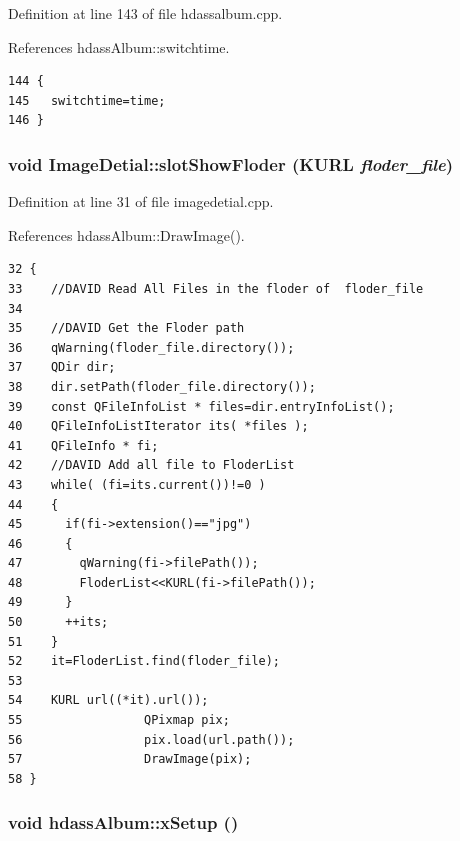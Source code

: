 Definition at line 143 of file hdassalbum.cpp.

References hdass\-Album::switchtime.



\footnotesize\begin{verbatim}144 {
145   switchtime=time;
146 }
\end{verbatim}\normalsize 
{}
\subsubsection{\setlength{\rightskip}{0pt plus 5cm}void Image\-Detial::slot\-Show\-Floder (KURL {\em floder\_\-file})\hspace{0.3cm}{\tt  [slot]}}\label{classImageDetial_ImageDetiali0}




Definition at line 31 of file imagedetial.cpp.

References hdass\-Album::Draw\-Image().



\footnotesize\begin{verbatim}32 {
33    //DAVID Read All Files in the floder of  floder_file
34    
35    //DAVID Get the Floder path
36    qWarning(floder_file.directory());
37    QDir dir;
38    dir.setPath(floder_file.directory());
39    const QFileInfoList * files=dir.entryInfoList();
40    QFileInfoListIterator its( *files );
41    QFileInfo * fi;
42    //DAVID Add all file to FloderList
43    while( (fi=its.current())!=0 )
44    {
45      if(fi->extension()=="jpg")
46      {
47        qWarning(fi->filePath());
48        FloderList<<KURL(fi->filePath());
49      }
50      ++its;
51    }
52    it=FloderList.find(floder_file);
53    
54    KURL url((*it).url());
55                 QPixmap pix;
56                 pix.load(url.path());
57                 DrawImage(pix);
58 }
\end{verbatim}\normalsize 
{}
\subsubsection{\setlength{\rightskip}{0pt plus 5cm}void hdass\-Album::x\-Setup ()\hspace{0.3cm}{\tt  [inherited]}}\label{classhdassAlbum_ImageDetiala2}




